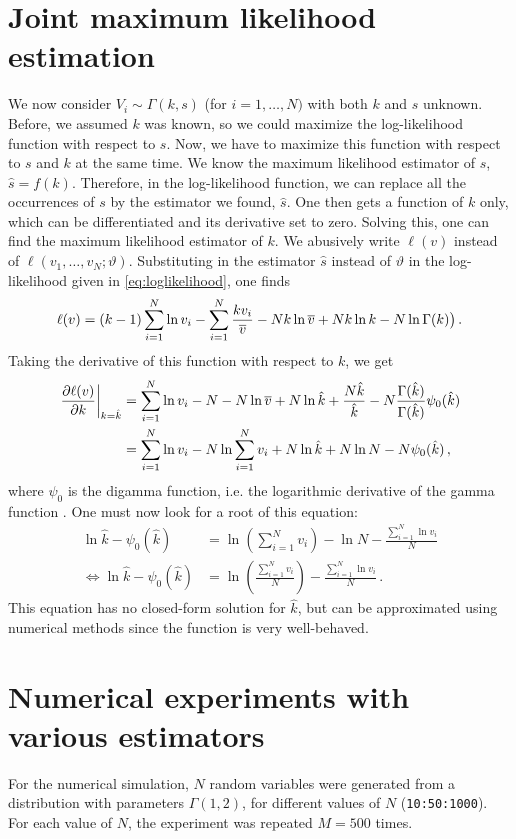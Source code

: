 \documentclass[final]{aomart}
\newtheorem[{}\it]{thm}{Theorem}[section]
\theoremstyle{definition}
\newtheorem*[{}\it]{notation}{Notation}
\numberwithin{equation}{section}
\newcommand{\dig}{\psi_0}
\renewcommand{\theta}{\vartheta}
\newcommand{\eval}[2][\right]{\relax
  \ifx#1\right\relax \left.\fi#2#1\rvert}
\begin{document}
\section{Joint maximum likelihood estimation}
\label{sec:joint}
We now consider \(V_i \sim \Gamma(k, s)\) (for \(i = 1,\ldots,N)\) with both \(k\) and \(s\) unknown.
Before, we assumed \(k\) was known, so we could maximize the log-likelihood function with respect to \(s\).
Now, we have to maximize this function with respect to \(s\) and \(k\) at the same time.
We know the maximum likelihood estimator of \(s\), \(\hat{s} = f(k)\).
Therefore, in the log-likelihood function, we can replace all the occurrences of \(s\) by the estimator we found, \(\hat{s}\).
One then gets a function of \(k\) only, which can be differentiated and its derivative set to zero.
Solving this, one can find the maximum likelihood estimator of \(k\).
We abusively write \(\ell(v)\) instead of \(\ell(v_1, \ldots, v_N; \theta)\).
Substituting in the estimator \(\hat{s}\) instead of \(\theta\) in the log-likelihood given in \eqref{eq:loglikelihood}, one finds
\begin{align}
\ell(v) = (k-1) \sum_{i=1}^{N}\ln v_i - \sum_{i=1}^{N} \frac{kv_i}{\overline{v}} - N k \ln \overline{v} + N k \ln k - N \ln \Gamma(k)\big)\,.
\end{align}
Taking the derivative of this function with respect to \(k\), we get
\begin{align}
\eval{\frac{\partial \ell(v)}{\partial k}}_{k = \hat{k}} &= \sum_{i=1}^N \ln v_i - N - N \ln \widebar{v} + N \ln \hat{k} + \frac{N\hat{k}}{\hat{k}} - N\frac{\Gamma(\hat{k})}{\Gamma(\hat{k})}\dig(\hat{k})\\
&= \sum_{i=1}^N \ln v_i - N \ln \sum_{i=1}^N v_i + N \ln \hat{k}  + N \ln N - N \dig(\hat{k})\,,
\end{align}
where \(\dig\) is the digamma function, i.e. the logarithmic derivative of the gamma function \cite{wolf:dig}.
One must now look for a root of this equation:
\begin{align}
\ln \hat{k} - \dig(\hat{k}) &= \ln \left(\sum_{i=1}^N v_i\right) - \ln N - \frac{\sum_{i=1}^N \ln v_i}{N}\\
\iff \ln \hat{k}  - \dig(\hat{k}) &= \ln \left(\frac{\sum_{i=1}^N v_i}{N}\right) - \frac{\sum_{i=1}^N \ln v_i}{N}\,.\label{eq:mlk}
\end{align}
This equation has no closed-form solution for \(\hat{k}\), but can be approximated using numerical methods since the function is very well-behaved.

\section{Numerical experiments with various estimators}
\label{sec:est_code}
For the numerical simulation, \(N\) random variables were generated from a distribution with parameters \(\Gamma(1, 2)\), for different values of \(N\) (\texttt{10:50:1000}).
For each value of \(N\), the experiment was repeated \(M = 500\) times.
\end{document}
